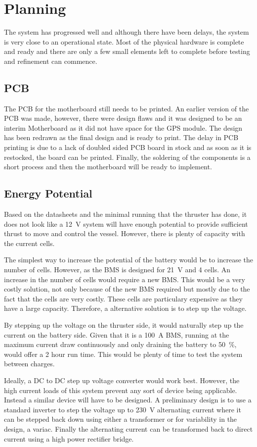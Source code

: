 \chapter{Planning}
The system has progressed well and although there have been delays, the system is very close to an operational state. Most of the physical hardware is complete and ready and there are only a few small elements left to complete before testing and refinement can commence.
\section{PCB}
The PCB for the motherboard still needs to be printed. An earlier version of the PCB was made, however, there were design flaws and it was designed to be an interim Motherboard as it did not have space for the GPS module. The design has been redrawn as the final design and is ready to print. The delay in PCB printing is due to a lack of doubled sided PCB board in stock and as soon as it is restocked, the board can be printed. Finally, the soldering of the components is a short process and then the motherboard will be ready to implement.
\section{Energy Potential}
Based on the datasheets and the minimal running that the thruster has done, it does not look like a \SI{12}{\volt} system will have enough potential to provide sufficient thrust to move and control the vessel. However, there is plenty of capacity with the current cells.\par
\vspace{0.4cm}
The simplest way to increase the potential of the battery would be to increase the number of cells. However, as the BMS is designed for \SI{21}{\volt} and 4 cells. An increase in the number of cells would require a new BMS. This would be a very costly solution, not only because of the new BMS required but mostly due to the fact that the cells are very costly. These cells are particulary expensive as they have a large capacity. Therefore, a alternative solution is to step up the voltage.\par
\vspace{0.4cm}
By stepping up the voltage on the thruster side, it would naturally step up the current on the battery side. Given that it is a \SI{100}{\ampere} BMS, running at the maximum current draw continuously and only draining the battery to \SI{50}{\percent}, would offer a 2 hour run time. This would be plenty of time to test the system between charges.\par
\vspace{0.4cm}
Ideally, a DC to DC step up voltage converter would work best. However, the high current loads of this system prevent any sort of device being applicable. Instead a similar device will have to be designed. A preliminary design is to use a standard inverter to step the voltage up to \SI{230}{\volt} alternating current where it can be stepped back down using either a transformer or for variability in the design, a variac. Finally the alternating current can be transformed back to direct current using a high power rectifier bridge. 
